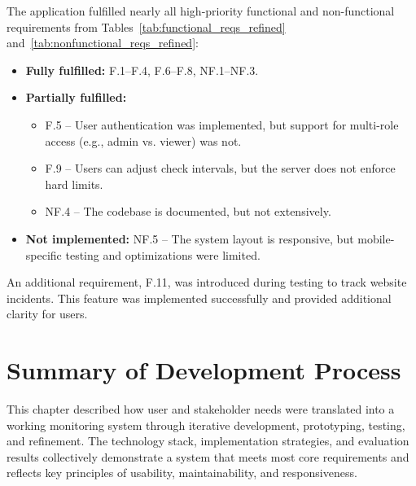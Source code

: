 The application fulfilled nearly all high-priority functional and non-functional requirements from Tables~\ref{tab:functional_reqs_refined} and~\ref{tab:nonfunctional_reqs_refined}:

\begin{itemize}
    \item \textbf{Fully fulfilled:} F.1–F.4, F.6–F.8, NF.1–NF.3.
    \item \textbf{Partially fulfilled:} 
        \begin{itemize}
            \item F.5 – User authentication was implemented, but support for multi-role access (e.g., admin vs. viewer) was not.
            \item F.9 – Users can adjust check intervals, but the server does not enforce hard limits.
            \item NF.4 – The codebase is documented, but not extensively.
        \end{itemize}
    \item \textbf{Not implemented:} NF.5 – The system layout is responsive, but mobile-specific testing and optimizations were limited.
\end{itemize}

An additional requirement, F.11, was introduced during testing to track website incidents. This feature was implemented successfully and provided additional clarity for users.




\section{Summary of Development Process} 
This chapter described how user and stakeholder needs were translated into a working monitoring system through iterative development, prototyping, testing, and refinement. The technology stack, implementation strategies, and evaluation results collectively demonstrate a system that meets most core requirements and reflects key principles of usability, maintainability, and responsiveness.